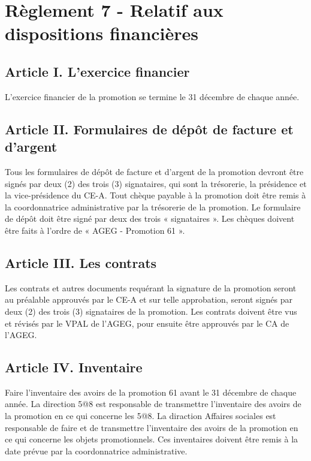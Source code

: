 
\section*{Règlement 7 - Relatif aux dispositions financières} 

\subsection*{Article I. L'exercice financier}
L'exercice financier de la promotion se termine le 31 décembre de chaque année. 

\subsection*{Article II. Formulaires de dépôt de facture et d'argent}
Tous les formulaires de dépôt de facture et d'argent de la promotion devront être signés par deux (2) des trois (3) signataires, qui sont la trésorerie, la présidence et la vice-présidence du CE-A. Tout chèque payable à la promotion doit être remis à la coordonnatrice administrative par la trésorerie de la promotion. Le formulaire de dépôt doit être signé par deux des trois « signataires ». Les chèques doivent être faits à l'ordre de « AGEG - Promotion 61 ».

\subsection*{Article III. Les contrats}
Les contrats et autres documents requérant la signature de la promotion seront au préalable approuvés par le CE-A et sur telle approbation, seront signés par deux (2) des trois (3) signataires de la promotion. Les contrats doivent être vus et révisés par le VPAL de l'AGEG, pour ensuite être approuvés par le CA de l'AGEG.

\subsection*{Article IV. Inventaire}
Faire l’inventaire des avoirs de la promotion 61 avant le 31 décembre de chaque année. La direction 5@8 est responsable de transmettre l’inventaire des avoirs de la promotion en ce qui concerne les 5@8. La diraction Affaires sociales est responsable de faire et de transmettre l’inventaire des avoirs de la promotion en ce qui concerne les objets promotionnels. Ces inventaires doivent être remis à la date prévue par la coordonnatrice administrative.

